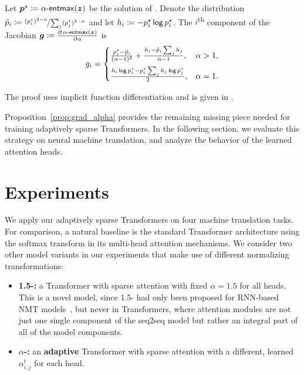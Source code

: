 \begin{proposition}\label{prop:grad_alpha}%
    Let $\bm{p}^\star \coloneqq \mathop{\mathsf{\alpha}\textnormal{-}\mathsf{entmax}}(\bm{z})$ be the solution of
    .
    Denote the distribution $\tilde{p}_i \coloneqq \nicefrac{(p_i^\star)^{2 - \alpha}}{
            \sum_j(p_j^\star)^{2-\alpha}}$ and let
    $h_i \coloneqq -p^\star_i \operatorname*{\mathsf{log}} p^\star_i$.
    The $i$\textsuperscript{th} component of the Jacobian
    $\bm{g} \coloneqq \frac{\partial \mathop{\mathsf{\alpha}\textnormal{-}\mathsf{entmax}}(\bm{z})}{\partial \alpha}$ is
    \begin{equation}\label{eq:final_gradient_alpha}
        g_i =%
        \begin{cases}
            \frac{p_i^{\star} - \tilde{\pp}_i}{(\alpha-1)^2} +
            \frac{h_i - \tilde{\pp}_i%
                \sum_j h_j%
            }{\alpha-1},                                                                  & \alpha > 1, \\[1.5ex]
            \frac{h_i \log \pp_i^{\star} - \pp_i^{\star} \sum_j h_j \log p_j^{\star}}{2}, & \alpha = 1.
        \end{cases}
    \end{equation}
\end{proposition}
\noindent%
The proof uses implicit function differentiation and is given in .

Proposition~\ref{prop:grad_alpha} provides the remaining missing
piece needed for training adaptively sparse Transformers. In the
following section, we evaluate this strategy on neural machine
translation, and analyze the behavior of the learned attention heads.

\section{Experiments}
We apply our adaptively sparse Transformers on four machine translation tasks.
For comparison, a natural baseline is the standard Transformer
architecture using the softmax transform in its multi-head attention mechanisms.
We consider two other model variants in our experiments that make use of different
normalizing transformations:

\begin{itemize}
    \item \textbf{1.5-\entmaxtext:} a Transformer with sparse \entmaxtext
          attention with fixed $\alpha=1.5$ for all heads. This is a novel model,
          since 1.5-\entmaxtext{} had only been proposed for
          RNN-based NMT models~\citep{entmax}, but never
          in Transformers, where attention modules are not just one single
          component of the seq2seq model but rather an integral part of all of
          the model components.%
    \item \textbf{\boldmath $\alpha$-\entmaxtext:} an \textbf{adaptive}
          Transformer with sparse \entmaxtext attention with a different,
          learned $\alpha_{i,j}^t$ for each head.
\end{itemize}

